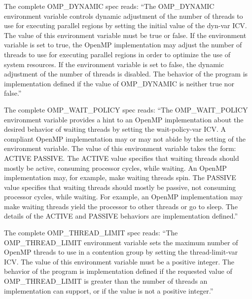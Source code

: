 The complete OMP\_DYNAMIC spec reads: 
``The OMP\_DYNAMIC environment variable controls dynamic adjustment of the number of threads
to use for executing parallel regions by setting the initial value of the dyn-var ICV. The value of
this environment variable must be true or false. If the environment variable is set to true, the
OpenMP implementation may adjust the number of threads to use for executing parallel
regions in order to optimize the use of system resources. If the environment variable is set to
false, the dynamic adjustment of the number of threads is disabled. The behavior of the program
is implementation defined if the value of OMP\_DYNAMIC is neither true nor false.''


The complete OMP\_WAIT\_POLICY spec reads: 
``The OMP\_WAIT\_POLICY environment variable provides a hint to an OpenMP
 implementation about the desired behavior of waiting threads by setting the wait-policy-var ICV. A
 compliant OpenMP implementation may or may not abide by the setting of the environment
 variable.
 The value of this environment variable takes the form:
 ACTIVE \textbar  PASSIVE. 
 The ACTIVE value specifies that waiting threads should mostly be active, consuming processor
 cycles, while waiting. An OpenMP implementation may, for example, make waiting threads spin.
 The PASSIVE value specifies that waiting threads should mostly be passive, not consuming
 processor cycles, while waiting. For example, an OpenMP implementation may make waiting
 threads yield the processor to other threads or go to sleep.
 The details of the ACTIVE and PASSIVE behaviors are implementation defined.''

 
The complete OMP\_THREAD\_LIMIT spec reads:
``The OMP\_THREAD\_LIMIT environment variable sets the maximum number of OpenMP threads to use in a contention group by setting the thread-limit-var ICV.
The value of this environment variable must be a positive integer. The behavior of the program is implementation defined if the requested value of OMP\_THREAD\_LIMIT is greater than the number of threads an implementation can support, or if the value is not a positive integer.''
